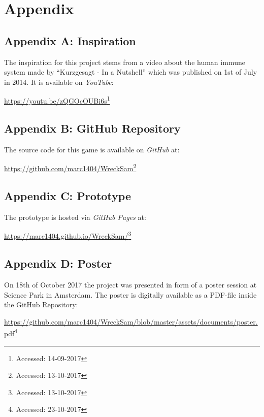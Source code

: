 \section*{Appendix}

\subsection*{Appendix A: Inspiration}
The inspiration for this project stems from a video about the human immune system made by \enquote{Kurzgesagt - In a Nutshell} which was published on 1st of July in 2014. It is available on \textit{YouTube}:

\url{https://youtu.be/zQGOcOUBi6s}\footnote{Accessed: 14-09-2017}

\subsection*{Appendix B: GitHub Repository} \label{appendix-b}
The source code for this game is available on \textit{GitHub} at:

\url{https://github.com/marc1404/WreckSam}\footnote{Accessed: 13-10-2017}

\subsection*{Appendix C: Prototype} \label{prototype}
The prototype is hosted via \textit{GitHub Pages} at:

\url{https://marc1404.github.io/WreckSam/}\footnote{Accessed: 13-10-2017}

\subsection*{Appendix D: Poster}
On 18th of October 2017 the project was presented in form of a poster session at Science Park in Amsterdam. The poster is digitally available as a PDF-file inside the GitHub Repository:

\url{https://github.com/marc1404/WreckSam/blob/master/assets/documents/poster.pdf}\footnote{Accessed: 23-10-2017}
